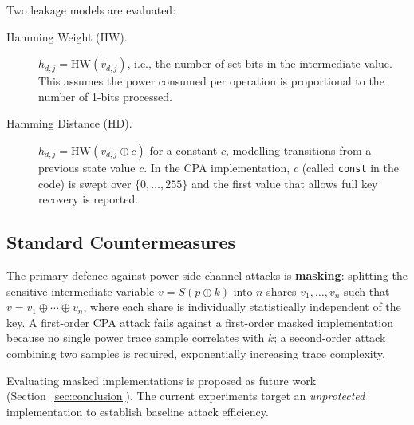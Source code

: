 Two leakage models are evaluated:

\begin{description}
  \item[Hamming Weight (HW).]
    $h_{d,j} = \mathrm{HW}(v_{d,j})$, i.e., the number of set bits in the
    intermediate value.
    This assumes the power consumed per operation is proportional to the
    number of 1-bits processed.

  \item[Hamming Distance (HD).]
    $h_{d,j} = \mathrm{HW}(v_{d,j} \oplus c)$ for a constant $c$, modelling
    transitions from a previous state value $c$.
    In the CPA implementation, $c$ (called \texttt{const} in the code) is
    swept over $\{0, \ldots, 255\}$ and the first value that allows full key
    recovery is reported.
\end{description}

\subsection{Standard Countermeasures}

The primary defence against power side-channel attacks is \textbf{masking}:
splitting the sensitive intermediate variable $v = S(p \oplus k)$ into $n$
shares $v_1, \ldots, v_n$ such that $v = v_1 \oplus \cdots \oplus v_n$, where
each share is individually statistically independent of the key.
A first-order CPA attack fails against a first-order masked implementation
because no single power trace sample correlates with $k$; a second-order
attack combining two samples is required, exponentially increasing trace
complexity.

Evaluating masked implementations is proposed as future work
(Section~\ref{sec:conclusion}).
The current experiments target an \emph{unprotected} implementation to
establish baseline attack efficiency.
